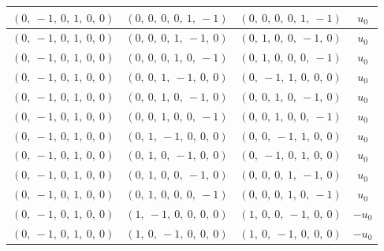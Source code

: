 \documentclass[11pt]{article}
\theoremstyle{definition}
\begin{document}
\begin{longtable}{|l|l|l|c|}
    \hline
    $\left( 0, \  -1, \  0, \  1, \  0, \  0\right)$ & $\left( 0, \  0, \  0, \  0, \  1, \  -1\right)$ & $\left( 0, \  0, \  0, \  0, \  1, \  -1\right)$ & $u_{0}$ \\
    \hline
    $\left( 0, \  -1, \  0, \  1, \  0, \  0\right)$ & $\left( 0, \  0, \  0, \  1, \  -1, \  0\right)$ & $\left( 0, \  1, \  0, \  0, \  -1, \  0\right)$ & $u_{0}$ \\
    \hline
    $\left( 0, \  -1, \  0, \  1, \  0, \  0\right)$ & $\left( 0, \  0, \  0, \  1, \  0, \  -1\right)$ & $\left( 0, \  1, \  0, \  0, \  0, \  -1\right)$ & $u_{0}$ \\
    \hline
    $\left( 0, \  -1, \  0, \  1, \  0, \  0\right)$ & $\left( 0, \  0, \  1, \  -1, \  0, \  0\right)$ & $\left( 0, \  -1, \  1, \  0, \  0, \  0\right)$ & $u_{0}$ \\
    \hline
    $\left( 0, \  -1, \  0, \  1, \  0, \  0\right)$ & $\left( 0, \  0, \  1, \  0, \  -1, \  0\right)$ & $\left( 0, \  0, \  1, \  0, \  -1, \  0\right)$ & $u_{0}$ \\
    \hline
    $\left( 0, \  -1, \  0, \  1, \  0, \  0\right)$ & $\left( 0, \  0, \  1, \  0, \  0, \  -1\right)$ & $\left( 0, \  0, \  1, \  0, \  0, \  -1\right)$ & $u_{0}$ \\
    \hline
    $\left( 0, \  -1, \  0, \  1, \  0, \  0\right)$ & $\left( 0, \  1, \  -1, \  0, \  0, \  0\right)$ & $\left( 0, \  0, \  -1, \  1, \  0, \  0\right)$ & $u_{0}$ \\
    \hline
    $\left( 0, \  -1, \  0, \  1, \  0, \  0\right)$ & $\left( 0, \  1, \  0, \  -1, \  0, \  0\right)$ & $\left( 0, \  -1, \  0, \  1, \  0, \  0\right)$ & $u_{0}$ \\
    \hline
    $\left( 0, \  -1, \  0, \  1, \  0, \  0\right)$ & $\left( 0, \  1, \  0, \  0, \  -1, \  0\right)$ & $\left( 0, \  0, \  0, \  1, \  -1, \  0\right)$ & $u_{0}$ \\
    \hline
    $\left( 0, \  -1, \  0, \  1, \  0, \  0\right)$ & $\left( 0, \  1, \  0, \  0, \  0, \  -1\right)$ & $\left( 0, \  0, \  0, \  1, \  0, \  -1\right)$ & $u_{0}$ \\
    \hline
    $\left( 0, \  -1, \  0, \  1, \  0, \  0\right)$ & $\left( 1, \  -1, \  0, \  0, \  0, \  0\right)$ & $\left( 1, \  0, \  0, \  -1, \  0, \  0\right)$ & $- u_{0}$ \\
    \hline
    $\left( 0, \  -1, \  0, \  1, \  0, \  0\right)$ & $\left( 1, \  0, \  -1, \  0, \  0, \  0\right)$ & $\left( 1, \  0, \  -1, \  0, \  0, \  0\right)$ & $- u_{0}$ \\

\end{longtable}
\end{document}
